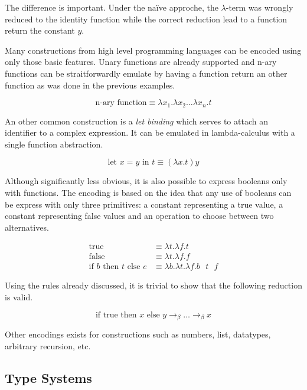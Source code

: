 \documentclass[a4paper, oneside, 12pt, titlepage]{article}
\begin{document}
The difference is important. Under the naïve approche, the $\lambda$-term was wrongly reduced to the
identity function while the correct reduction lead to a function return the constant $y$.

Many constructions from high level programming languages can be encoded using only those basic
features.  Unary functions are already supported and n-ary functions can be straitforwardly emulate
by having a function return an other function as was done in the previous examples.

\begin{displaymath}
  \text{n-ary function} \equiv \lambda x_1. \lambda x_2 \dots \lambda x_n. t
\end{displaymath}

An other common construction is a \emph{let binding} which serves to attach an identifier to a
complex expression. It can be emulated in lambda-calculus with a single function abstraction.

\begin{displaymath}
  \text{let } x = y \text{ in } t \equiv (\lambda x. t) y
\end{displaymath}

Although significantly less obvious, it is also possible to express booleans only with functions.
The encoding is based on the idea that any use of booleans can be express with only three
primitives: a constant representing a true value, a constant representing false values and an
operation to choose between two alternatives.

\begin{align*}
  \text{true}
    & \equiv \lambda t. \lambda f. t \\
  \text{false}
    & \equiv \lambda t. \lambda f. f \\
  \text{if } b \text{ then } t \text{ else } e
    & \equiv \lambda b. \lambda t. \lambda f. b \text{ } t \text{ } f
\end{align*}

Using the rules already discussed, it is trivial to show that the following reduction is valid.

\begin{displaymath}
  \text{if true then } x \text{ else } y \to_\beta \dots \to_\beta x
\end{displaymath}

Other encodings exists for constructions such as numbers, list, datatypes, arbitrary recursion, etc.

\subsection{Type Systems}
\end{document}

